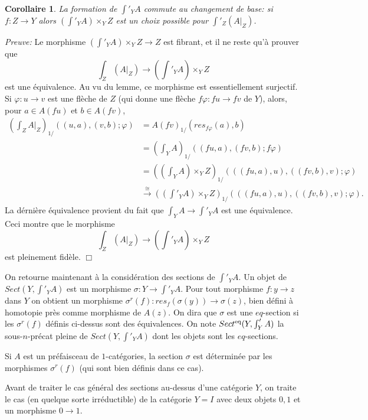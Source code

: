 \documentclass[12pt]{article}
\newcommand{\eop}{\hfill $\Box$\vspace{.1in}}
\newtheorem{corollaire}[lemma]{Corollaire}
\begin{document}
\begin{corollaire}
La formation de $\int '_YA$ commute au changement de base: si $f:Z\rightarrow Y$
alors $(\int '_YA)\times _YZ$ est un choix possible pour $\int '_Z(A|_Z)$.
\end{corollaire}
{\em Preuve:}
Le morphisme $(\int '_YA)\times _YZ\rightarrow Z$ est fibrant, et il ne
reste qu'\`a
prouver que
$$
\int _Z(A|_Z)\rightarrow  (\int '_YA)\times _YZ
$$
est une \'equivalence. Au vu du lemme, ce morphisme est essentiellement
surjectif.
Si $\varphi : u\rightarrow v$ est une fl\`eche de $Z$ (qui donne une fl\`eche
$f\varphi : fu\rightarrow fv$ de $Y$), alors, pour $a\in A(fu)$ et $b\in A(fv)$,
\begin{align*}
(\int _ZA|_Z)_{1/}((u,a), (v,b); \varphi ) &= A(fv)_{1/}(res_{f\varphi}(a),
b)\\
&= (\int _YA)_{1/}((fu,a), (fv,b); f\varphi ) \\
& = ((\int _YA)\times _YZ)_{1/}(((fu,a), u), ((fv,b), v); \varphi )\\
& \stackrel{\cong}{\rightarrow}
((\int' _YA)\times _YZ)_{1/}(((fu,a), u), ((fv,b), v); \varphi ).
\end{align*}
La d\'erni\`ere \'equivalence
provient du fait que $\int _YA\rightarrow \int '_YA$ est une
\'equivalence. Ceci montre que le morphisme
$$
\int _Z(A|_Z)\rightarrow  (\int '_YA)\times _YZ
$$
est pleinement fid\`ele.
\eop


On retourne maintenant \`a la consid\'eration des sections de $\int '_YA$.
Un objet de \linebreak
$Sect(Y,\int '_YA)$ est un morphisme $\sigma : Y\rightarrow
\int '_YA$. Pour tout morphisme $f:y\rightarrow z$ dans $Y$ on obtient un
morphisme $\sigma ^r(f): res_f(\sigma (y))\rightarrow \sigma (z)$, bien d\'efini
\`a homotopie pr\`es comme morphisme de $A(z)$. On dira que $\sigma$ est une
$eq$-section si les $\sigma ^r(f)$ d\'efinis ci-dessus sont des \'equivalences.
On note $Sect^{\rm eq}(Y,\int '_YA)$ la sous-$n$-pr\'ecat pleine de
$Sect(Y,\int '_YA)$  dont les objets sont les
$eq$-sections.

Si $A$ est un pr\'efaisceau de $1$-cat\'egories, la section $\sigma$
est d\'etermin\'ee par les morphismes $\sigma ^r(f)$ (qui sont bien d\'efinis
dans ce cas).

Avant de traiter le cas g\'en\'eral des sections au-dessus d'une cat\'egorie
$Y$, on traite le cas (en quelque sorte irr\'eductible) de la cat\'egorie $Y=I$
avec deux objets $0,1$ et un morphisme $0\rightarrow 1$.
\end{document}
